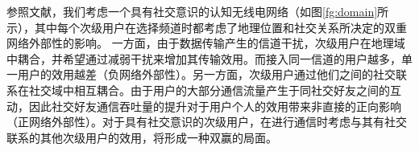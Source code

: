 参照文献\cite{Chenjournal}，我们考虑一个具有社交意识的认知无线电网络（如图\ref{fg:domain}所示），其中每个次级用户在选择频道时都考虑了地理位置和社交关系所决定的双重网络外部性的影响。
一方面，由于数据传输产生的信道干扰，次级用户在地理域中耦合，并希望通过减弱干扰来增加其传输效用。而接入同一信道的用户越多，单一用户的效用越差（负网络外部性）。另一方面，次级用户通过他们之间的社交联系在社交域中相互耦合。由于用户的大部分通信流量产生于同社交好友之间的互动，因此社交好友通信吞吐量的提升对于用户个人的效用带来非直接的正向影响（正网络外部性）。对于具有社交意识的次级用户，在进行通信时考虑与其有社交联系的其他次级用户的效用，将形成一种双赢的局面。

